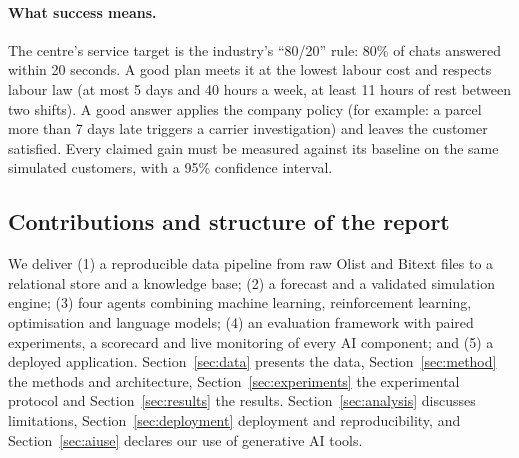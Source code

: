 \paragraph{What success means.} The centre's service target is the industry's ``80/20'' rule: 80\% of chats
answered within 20 seconds. A good plan meets it at the lowest labour cost and respects labour law (at most
5 days and 40 hours a week, at least 11 hours of rest between two shifts). A good answer applies the company
policy (for example: a parcel more than 7 days late triggers a carrier investigation) and leaves the customer
satisfied. Every claimed gain must be measured against its baseline on the same simulated customers, with a
95\% confidence interval.

\subsection{Contributions and structure of the report}
We deliver (1) a reproducible data pipeline from raw Olist and Bitext files to a relational store and a
knowledge base; (2) a forecast and a validated simulation engine; (3) four agents combining machine learning,
reinforcement learning, optimisation and language models; (4) an evaluation framework with paired
experiments, a scorecard and live monitoring of every AI component; and (5) a deployed application.
Section~\ref{sec:data} presents the data, Section~\ref{sec:method} the methods and architecture,
Section~\ref{sec:experiments} the experimental protocol and Section~\ref{sec:results} the results.
Section~\ref{sec:analysis} discusses limitations, Section~\ref{sec:deployment} deployment and
reproducibility, and Section~\ref{sec:aiuse} declares our use of generative AI tools.
